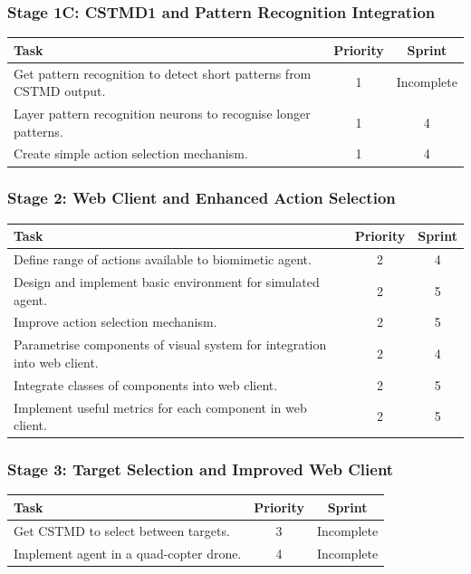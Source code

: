 \documentclass[a4paper,11pt]{article}
\begin{document}
\subsubsection{Stage 1C: CSTMD1 and Pattern Recognition Integration}
\begin{center}
    \begin{tabular}{p{12cm} c c}
    \textbf{Task} & \textbf{Priority} & \textbf{Sprint} \\ \hline
	Get pattern recognition to detect short patterns from CSTMD output. & 1 & Incomplete \\
	Layer pattern recognition neurons to recognise longer patterns. & 1 & 4\\
	Create simple action selection mechanism. & 1 & 4 \\
    \end{tabular}
\end{center}

\subsubsection{Stage 2: Web Client and Enhanced Action Selection}
\begin{center}
    \begin{tabular}{p{12cm} c c}
    \textbf{Task} & \textbf{Priority} & \textbf{Sprint} \\ \hline
    Define range of actions available to biomimetic agent. & 2 & 4 \\
    Design and implement basic environment for simulated agent. & 2 & 5 \\
    Improve action selection mechanism. & 2 & 5 \\
	Parametrise components of visual system for integration into web client. & 2 & 4 \\
	Integrate classes of components into web client. & 2 & 5 \\	
	Implement useful metrics for each component in web client. & 2 & 5 \\
    \end{tabular}
\end{center}

\subsubsection{Stage 3: Target Selection and Improved Web Client}
\begin{center}
    \begin{tabular}{p{12cm} c c}
    \textbf{Task} & \textbf{Priority} & \textbf{Sprint} \\ \hline
    Get CSTMD to select between targets. & 3 & Incomplete \\
    Implement agent in a quad-copter drone. & 4 & Incomplete \\
    \end{tabular}
\end{center}
\end{document}
